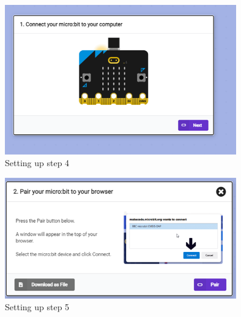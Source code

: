 \begin{figure}
    \centering
    \includegraphics[width=10cm]{chapters/ChapterP2-datalog/figures/datalog5.png}
    \caption{Setting up step 4}
    \label{fig:datalogstep4}
\end{figure}
\begin{figure}
    \centering
    \includegraphics[width=10cm]{chapters/ChapterP2-datalog/figures/datalog6.png}
    \caption{Setting up step 5}
    \label{fig:datalogstep5}
\end{figure}

